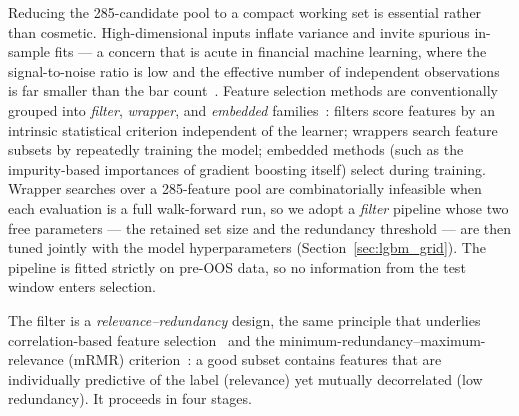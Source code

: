 Reducing the 285-candidate pool to a compact working set is essential rather than cosmetic. High-dimensional inputs inflate variance and invite spurious in-sample fits --- a concern that is acute in financial machine learning, where the signal-to-noise ratio is low and the effective number of independent observations is far smaller than the bar count~\cite{lopezdeprado2018advances}. Feature selection methods are conventionally grouped into \textit{filter}, \textit{wrapper}, and \textit{embedded} families~\cite{guyon2003introduction}: filters score features by an intrinsic statistical criterion independent of the learner; wrappers search feature subsets by repeatedly training the model; embedded methods (such as the impurity-based importances of gradient boosting itself) select during training. Wrapper searches over a 285-feature pool are combinatorially infeasible when each evaluation is a full walk-forward run, so we adopt a \textit{filter} pipeline whose two free parameters --- the retained set size and the redundancy threshold --- are then tuned jointly with the model hyperparameters (Section~\ref{sec:lgbm_grid}). The pipeline is fitted strictly on pre-OOS data, so no information from the test window enters selection.


The filter is a \textit{relevance--redundancy} design, the same principle that underlies correlation-based feature selection~\cite{hall1999correlation} and the minimum-redundancy--maximum-relevance (mRMR) criterion~\cite{peng2005feature}: a good subset contains features that are individually predictive of the label (relevance) yet mutually decorrelated (low redundancy). It proceeds in four stages.

